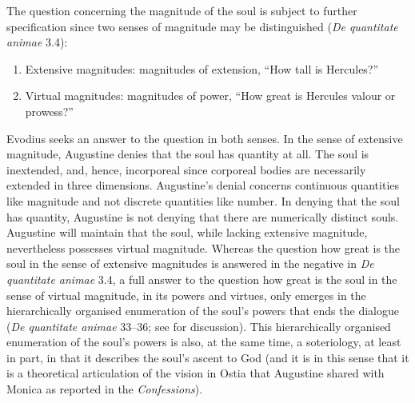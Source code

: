 \documentclass[12pt]{article}
\begin{document}
The question concerning the magnitude of the soul is subject to further specification since two senses of magnitude may be distinguished (\emph{De quantitate animae} 3.4):
\begin{enumerate}
	\item Extensive magnitudes: magnitudes of extension, “How tall is Hercules?”
	\item Virtual magnitudes: magnitudes of power, “How great is Hercules valour or prowess?”
\end{enumerate}
Evodius seeks an answer to the question in both senses. In the sense of extensive magnitude, Augustine denies that the soul has quantity at all. The soul is inextended, and, hence, incorporeal since corporeal bodies are necessarily extended in three dimensions. Augustine's denial concerns continuous quantities like magnitude and not discrete quantities like number. In denying that the soul has quantity, Augustine is not denying that there are numerically distinct souls. Augustine will maintain that the soul, while lacking extensive magnitude, nevertheless possesses virtual magnitude. Whereas the question how great is the soul in the sense of extensive magnitudes is answered in the negative in \emph{De quantitate animae} 3.4, a full answer to the question how great is the soul in the sense of virtual magnitude, in its powers and virtues, only emerges in the hierarchically organised enumeration of the soul’s powers that ends the dialogue (\emph{De quantitate animae} 33–36; see \citealt{Brittain2003-BRICA-2} for discussion). This hierarchically organised enumeration of the soul’s powers is also, at the same time, a soteriology, at least in part, in that it describes the soul’s ascent to God (and it is in this sense that it is a theoretical articulation of the vision in Ostia that Augustine shared with Monica as reported in the \emph{Confessions}).
\end{document}
